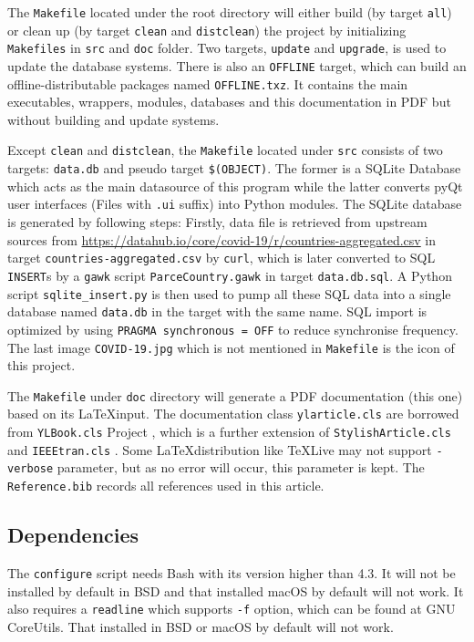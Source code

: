 \documentclass[]{ylarticle}
\begin{document}
The \verb|Makefile| located under the root directory will either build (by target \verb|all|) or clean up (by target \verb|clean| and \verb|distclean|) the project by initializing \verb|Makefiles| in \verb|src| and \verb|doc| folder. Two targets, \verb|update| and \verb|upgrade|, is used to update the database systems. There is also an \verb|OFFLINE| target, which can build an offline-distributable packages named \verb|OFFLINE.txz|. It contains the main executables, wrappers, modules, databases and this documentation in PDF but without building and update systems.

Except \verb|clean| and \verb|distclean|, the \verb|Makefile| located under \verb|src| consists of two targets: \verb|data.db| and pseudo target \verb|$(OBJECT)|. The former is a SQLite Database which acts as the main datasource of this program while the latter converts pyQt user interfaces (Files with \verb|.ui| suffix) into Python modules. The SQLite database is generated by following steps: Firstly, data file is retrieved from upstream sources from \url{https://datahub.io/core/covid-19/r/countries-aggregated.csv} in target \verb|countries-aggregated.csv| by \verb|curl|, which is later converted to SQL \verb|INSERT|s by a \verb|gawk| script \verb|ParceCountry.gawk| in target \verb|data.db.sql|. A Python script \verb|sqlite_insert.py| is then used to pump all these SQL data into a single database named \verb|data.db| in the target with the same name. SQL import is optimized by using \verb|PRAGMA synchronous = OFF| to reduce synchronise frequency. The last image \verb|COVID-19.jpg| which is not mentioned in \verb|Makefile| is the icon of this project.

The \verb|Makefile| under \verb|doc| directory will generate a PDF documentation (this one) based on its \LaTeX input. The documentation class \verb|ylarticle.cls| are borrowed from \verb|YLBook.cls| Project \cite{YLBook}, which is a further extension of \verb|StylishArticle.cls| \cite{Stylish} and \verb|IEEEtran.cls| \cite{IEEEtran}. Some \LaTeX distribution like \TeX Live may not support \verb|-verbose| parameter, but as no error will occur, this parameter is kept. The \verb|Reference.bib| records all references used in this article.

\subsection{Dependencies}
The \verb|configure| script needs Bash with its version higher than 4.3. It will not be installed by default in BSD and that installed macOS by default will not work. It also requires a \verb|readline| which supports \verb|-f| option, which can be found at GNU CoreUtils. That installed in BSD or macOS by default will not work.
\end{document}
